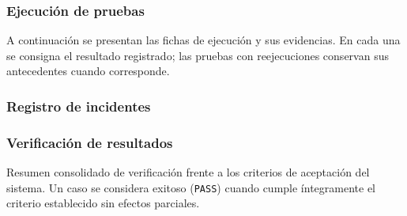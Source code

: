 \documentclass[11pt]{article}
\let\oldtexttt\texttt
\renewcommand{\texttt}[1]{\oldtexttt{\hyphenchar\font=45\relax #1}}
\renewcommand{\_}{\textunderscore\allowbreak}
\newcommand{\fila}[5]{\oldtexttt{#1} & #2 & #3 & #4 & #5 \\ \hline}
\begin{document}
\subsubsection{Ejecución de pruebas}
\setcounter{secnumdepth}{4}
\titleformat{\paragraph}[block]{\normalfont\small\bfseries}{\theparagraph}{0.6em}{}
\titlespacing*{\paragraph}{0pt}{8pt}{3pt}
\setcounter{paragraph}{0}
A continuación se presentan las fichas de ejecución y sus evidencias. En cada una se consigna el
resultado registrado; las pruebas con reejecuciones conservan sus antecedentes cuando corresponde.

\clearpage

\clearpage

\clearpage

\clearpage


\clearpage
\setcounter{secnumdepth}{3}
\subsubsection{Registro de incidentes}


\subsubsection{Verificación de resultados}
Resumen consolidado de verificación frente a los criterios de aceptación del sistema. Un caso se
considera exitoso (\texttt{PASS}) cuando cumple íntegramente el criterio establecido sin efectos
parciales.
\end{document}

